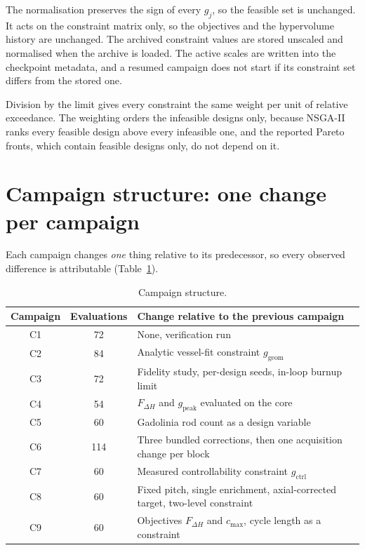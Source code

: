 The normalisation preserves the sign of every $g_j$, so the feasible set
is unchanged. It acts on the constraint matrix only, so the objectives
and the hypervolume history are unchanged. The archived constraint
values are stored unscaled and normalised when the archive is loaded.
The active scales are written into the checkpoint metadata, and a
resumed campaign does not start if its constraint set differs from the
stored one.

Division by the limit gives every constraint the same weight per unit of
relative exceedance. The weighting orders the infeasible designs only,
because NSGA-II ranks every feasible design above every infeasible one,
and the reported Pareto fronts, which contain feasible designs only, do
not depend on it.

\section{Campaign structure: one change per campaign}
\label{sec:meth-campaigns}

Each campaign changes \emph{one} thing relative to its predecessor, so
every observed difference is attributable
(Table~\ref{tab:campaigns}).

\begin{table}[htbp]
  \centering
  \small
  \caption{Campaign structure.}
  \label{tab:campaigns}
  \begin{tabularx}{\textwidth}{@{}cc>{\raggedright\arraybackslash}X@{}}
    \toprule
    Campaign & Evaluations & Change relative to the previous campaign \\
    \midrule
    C1 & 72  & None, verification run \\
    C2 & 84  & Analytic vessel-fit constraint $g_\mathrm{geom}$ \\
    C3 & 72  & Fidelity study, per-design seeds, in-loop burnup limit \\
    C4 & 54  & $F_{\Delta H}$ and $g_\mathrm{peak}$ evaluated on the core \\
    C5 & 60  & Gadolinia rod count as a design variable \\
    C6 & 114 & Three bundled corrections, then one acquisition change per block \\
    C7 & 60  & Measured controllability constraint $g_\mathrm{ctrl}$ \\
    C8 & 60  & Fixed pitch, single enrichment, axial-corrected target, two-level constraint \\
    C9 & 60  & Objectives $F_{\Delta H}$ and $c_\mathrm{max}$, cycle length as a constraint \\
    \bottomrule
  \end{tabularx}
\end{table}

